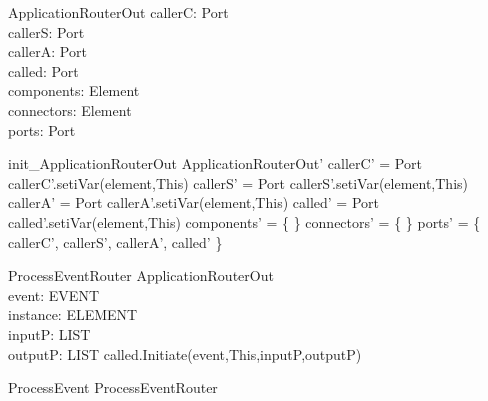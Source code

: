 \begin{schema}{ApplicationRouterOut}
callerC:  Port \\
callerS:  Port \\
callerA: Port \\
called:  Port \\
components: \pset Element \\
connectors: \pset Element \\
ports: \pset Port
\end{schema}


\begin{zed}
init\_ApplicationRouterOut \sdef \lsch ApplicationRouterOut'
                           \bbar callerC' = \new Port
                           \land callerC'.setiVar(element,This)
                           \land callerS' = \new Port
                           \land callerS'.setiVar(element,This)
                           \land callerA' = \new Port
                           \land callerA'.setiVar(element,This)
                           \land called' = \new Port
                           \land called'.setiVar(element,This)
                           \land components' = \{ \}
                           \land connectors' = \{ \}
                           \land ports' = \{ callerC', callerS', callerA', called' \}  \rsch
                           \end{zed}


\begin{schema}{ProcessEventRouter}
\Delta ApplicationRouterOut \\
event: EVENT \\
instance: ELEMENT \\
inputP: LIST \\
outputP: LIST
\where
called.Initiate(event,This,inputP,outputP)
\end{schema}

\begin{zed}
ProcessEvent \sdef ProcessEventRouter \end{zed}

